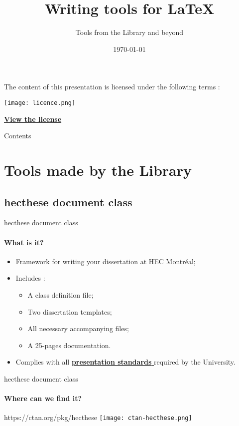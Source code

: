 \documentclass[aspectratio=1610,compress,t,gabaritb,french,english]{hecppt}
\title{Writing tools for {\LaTeX}}
\subtitle{Tools from the Library and beyond}
\date[]{\today}
\newcommand{\HEClien}[2]{%
	\href{#1}{\textbf{#2} \faExternalLink}
}
\begin{document}
\pageTitre

\begin{frame}[c]	
	\begin{center}
		The content of this presentation is licensed under the following terms :
	\end{center}		
	\texttt{[image: licence.png]}
	\begin{center}	
		\HEClien{https://creativecommons.org/licenses/by-nc-sa/4.0/}{View the license}
	\end{center}
\end{frame}

\begin{frame}[c]{Contents}
	\tableofcontents
\end{frame}

\section{Tools made by the Library}

	\subsection{hecthese document class}
	
		\begin{frame}[c,fragile]{hecthese document class}
			\framesubtitle{What is it?}
			
			\begin{itemize}
				\item Framework for writing your dissertation at HEC Montréal;
				\item Includes :
				\begin{itemize}
					\item A class definition file;
					\item Two dissertation templates;
					\item All necessary accompanying files;
					\item A 25-pages documentation.
				\end{itemize}
				\item Complies with all 
					\HEClien{http://www.hec.ca/qualitecomm/anglais/ressources/guide-redaction-depot-memoire-anglais.pdf}%
					{presentation standards} required by the University.
			\end{itemize}
		\end{frame}
	
		\begin{frame}{hecthese document class}
			\framesubtitle{Where can we find it?}
			
			\begin{HECimagesstitre}{\centering https://ctan.org/pkg/hecthese}
				\texttt{[image: ctan-hecthese.png]}
			\end{HECimagesstitre}
		\end{frame}
	
\end{document}
